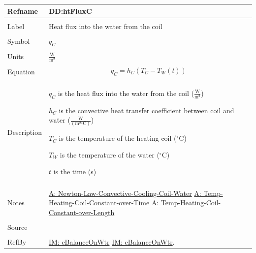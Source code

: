 \documentclass[12pt]{article}
\begin{document}
\noindent \begin{minipage}{\textwidth}
\begin{tabular}{p{} p{}}
\toprule \textbf{Refname} & \textbf{DD:htFluxC}
\label{DD:htFluxC}
\\ \midrule \\
Label & Heat flux into the water from the coil
\\ \midrule \\
Symbol & ${q_{C}}$
\\ \midrule \\
Units & $\frac{\text{W}}{\text{m}^{2}}$
\\ \midrule \\
Equation & \begin{displaymath}
           {q_{C}}={h_{C}} \left({T_{C}}-{T_{W}}\left(t\right)\right)
           \end{displaymath}
\\ \midrule \\
Description & \begin{symbDescription}
              \item{${q_{C}}$ is the heat flux into the water from the coil ($\frac{\text{W}}{\text{m}^{2}}$)}
              \item{${h_{C}}$ is the convective heat transfer coefficient between coil and water ($\frac{\text{W}}{(\text{m}^{2}{}^{\circ}\text{C})}$)}
              \item{${T_{C}}$ is the temperature of the heating coil (${}^{\circ}$C)}
              \item{${T_{W}}$ is the temperature of the water (${}^{\circ}$C)}
              \item{$t$ is the time (s)}
              \end{symbDescription}
\\ \midrule \\
Notes & \hyperref[assumpLCCCW]{A: Newton-Law-Convective-Cooling-Coil-Water}
        \hyperref[assumpTHCCoT]{A: Temp-Heating-Coil-Constant-over-Time}
        \hyperref[assumpTHCCoL]{A: Temp-Heating-Coil-Constant-over-Length}
\\ \midrule \\
Source & \cite{koothoor2013}
\\ \midrule \\
RefBy & \hyperref[IM:eBalanceOnWtr]{IM: eBalanceOnWtr} \hyperref[IM:eBalanceOnWtr]{IM: eBalanceOnWtr}.
\\ \bottomrule \end{tabular}
\end{minipage}
\par~
\end{document}

